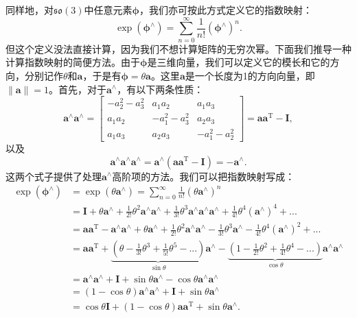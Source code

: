 同样地，对$\mathfrak{so}(3)$中任意元素$\bm{\phi}$，我们亦可按此方式定义它的指数映射：
\begin{equation}
\exp(\bm{\phi}^\wedge) = \sum\limits_{n = 0}^\infty  {\frac{1}{{n!}}{ (\bm{\phi}^{\wedge})^n}}.
\end{equation}
但这个定义没法直接计算，因为我们不想计算矩阵的无穷次幂。下面我们推导一种计算指数映射的简便方法。由于$\bm{\phi}$是三维向量，我们可以定义它的模长和它的方向，分别记作$\theta$和$\bm{a}$，于是有$\bm{\phi} = \theta \bm{a}$。这里$\bm{a}$是一个长度为1的方向向量，即$\| \bm{a} \| =1$。首先，对于$\bm{a}^\wedge$，有以下两条性质： %
\begin{equation}
 \bm{a}^{\wedge} \bm{a}^{\wedge} = \left[ {\begin{array}{*{20}{c}}
{ - a_2^2 - a_3^2}&{{a_1}{a_2}}&{{a_1}{a_3}}\\
{{a_1}{a_2}}&{ - a_1^2 - a_3^2}&{{a_2}{a_3}}\\
{{a_1}{a_3}}&{{a_2}{a_3}}&{ - a_1^2 - a_2^2}
\end{array}} \right] = \bm{a} \bm{a}^\mathrm{T} - \bm{I},
\end{equation}
以及
\begin{equation}
\bm{a}^{\wedge} \bm{a}^{\wedge} \bm{a}^{\wedge} = \bm{a}^\wedge (\bm{a}\bm{a}^\mathrm{T}-\bm{I}) = - \bm{a}^{\wedge}.
\end{equation}
这两个式子提供了处理$\bm{a}^\wedge$高阶项的方法。我们可以把指数映射写成：
\begin{align*}
\exp \left( {{\bm{\phi} ^ \wedge }} \right) &= \exp \left( {\theta {\bm{a}^ \wedge }} \right) = \sum\limits_{n = 0}^\infty  {\frac{1}{{n!}}{{\left( {\theta {\bm{a}^ \wedge }} \right)}^n}} \\
&= \bm{I} + \theta {\bm{a}^ \wedge } + \frac{1}{{2!}}{\theta ^2}{\bm{a}^ \wedge }{\bm{a}^ \wedge } + \frac{1}{{3!}}{\theta ^3}{\bm{a}^ \wedge }{\bm{a}^ \wedge }{\bm{a}^ \wedge } + \frac{1}{{4!}}{\theta ^4}{\left( {{\bm{a}^ \wedge }} \right)^4} + ...\\
&= \bm{a} {\bm{a}^\mathrm{T}} - {\bm{a}^ \wedge }{\bm{a}^ \wedge } + \theta {\bm{a}^ \wedge } + \frac{1}{{2!}}\theta^2 {\bm{a}^ \wedge }{\bm{a}^ \wedge } - \frac{1}{{3!}}{\theta ^3}{\bm{a}^ \wedge } - \frac{1}{{4!}}{\theta ^4}{\left( {{\bm{a}^ \wedge }} \right)^2} + ...\\
&= \bm{a}{\bm{a}^\mathrm{T}} + \underbrace{\left( {\theta  - \frac{1}{{3!}}{\theta ^3} + \frac{1}{{5!}}{\theta ^5} - ...} \right)}_{\sin \theta} {\bm{a}^ \wedge } - \underbrace{\left( {1 - \frac{1}{{2!}}{\theta ^2} + \frac{1}{{4!}}{\theta ^4} - ...} \right)}_{\cos \theta}{\bm{a}^ \wedge }{\bm{a}^ \wedge }\\
&= {\bm{a}^ \wedge }{\bm{a}^ \wedge } + \bm{I} + \sin \theta {\bm{a}^ \wedge } - \cos \theta {\bm{a}^ \wedge }{\bm{a}^ \wedge }\\
&= (1 - \cos \theta ){\bm{a}^ \wedge }{\bm{a}^ \wedge } + \bm{I} + \sin \theta {\bm{a}^ \wedge }\\
&= \cos \theta \bm{I} + (1 - \cos \theta )\bm{a}{\bm{a}^\mathrm{T}} + \sin \theta {\bm{a}^ \wedge }.
\end{align*}

